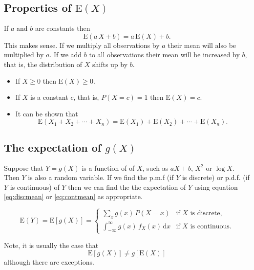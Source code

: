 \documentclass[
  11pt,
  british,
  openany, a4paper]{book}
\providecommand{\tightlist}{%
  \setlength{\itemsep}{0pt}\setlength{\parskip}{0pt}}
\begin{document}
\hypertarget{properties-of-mathrmex}{%
\subsection{\texorpdfstring{Properties of \(\mathrm{E}(X)\)}{Properties of \textbackslash mathrm\{E\}(X)}}\label{properties-of-mathrmex}}

If \(a\) and \(b\) are constants then
\[ \mathrm{E}(a\,X+b) = a\,\mathrm{E}(X)+b. \]
This makes sense. If we multiply all observations by \(a\) their mean will also be multiplied by \(a\). If we add \(b\) to all observations their mean will be increased by \(b\), that is, the distribution of \(X\) shifts up by \(b\).

\begin{itemize}
\tightlist
\item
  If \(X \geq 0\) then \(\mathrm{E}(X) \geq 0\).
\item
  If \(X\) is a constant \(c\), that is, \(P(X=c)=1\) then \(\mathrm{E}(X)=c\).
\item
  It can be shown that
  \[ \mathrm{E}(X_1 + X_2 + \cdots + X_n) = \mathrm{E}(X_1) + \mathrm{E}(X_2) + \cdots + \mathrm{E}(X_n). \]
\end{itemize}

\hypertarget{the-expectation-of-gx}{%
\subsection{\texorpdfstring{The expectation of \(g(X)\)}{The expectation of g(X)}}\label{the-expectation-of-gx}}

Suppose that \(Y=g(X)\) is a function of of \(X\), such as \(aX+b\), \(X^2\) or \(\log X\). Then \(Y\) is also a random variable. If we find the p.m.f (if \(Y\) is discrete) or p.d.f. (if \(Y\) is continuous) of \(Y\) then we can find the the expectation of \(Y\) using equation \eqref{eq:discmean} or \eqref{eq:contmean} as appropriate.

\begin{equation}
\mathrm{E}(Y) = \mathrm{E}[g(X)] =
\begin{cases} 
\displaystyle\sum_x g(x)\,P(X=x) & \text{if } X \text{ is discrete}, \\
\int_{-\infty}^{\infty} g(x)\,f_X(x) \,\mathrm{d}x & \text{if } X \text{ is continuous}.
\end{cases}
\label{eq:expfn}
\end{equation}

Note, it is usually the case that
\[ \mathrm{E}[g(X)] \neq g[\mathrm{E}(X)] \]
although there are exceptions.
\end{document}
